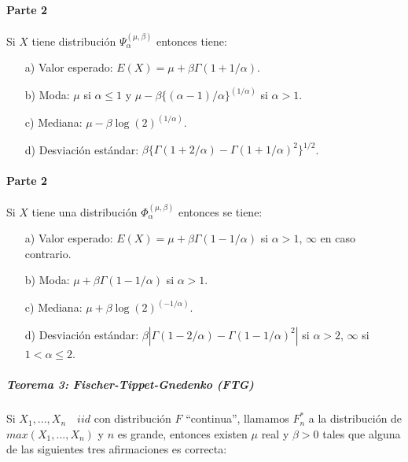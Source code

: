 \documentclass[
  12pt]{article}
\begin{document}
\hypertarget{parte-2}{%
\paragraph{Parte 2}\label{parte-2}}

Si \(X\) tiene distribución \(\Psi_{\alpha}^{(\mu,\beta)}\) entonces
tiene:

\begin{itemize}
  \item[a)] Valor esperado: $E(X) = \mu + \beta\Gamma(1+1/\alpha)$.
  \item[b)] Moda: $\mu$ si $\alpha\leq 1$ y $\mu-\beta\{(\alpha-1)/\alpha\}^{(1/\alpha)}$ si $\alpha>1$.
  \item[c)] Mediana: $\mu - \beta \log(2)^{(1/\alpha)}$.
  \item[d)] Desviación estándar: $\beta\{\Gamma(1+2/\alpha)-\Gamma(1+1/\alpha)^2\}^{1/2}$.
\end{itemize}

\hypertarget{parte-2-1}{%
\paragraph{Parte 2}\label{parte-2-1}}

Si \(X\) tiene una distribución \(\Phi_{\alpha}^{(\mu, \beta)}\)
entonces se tiene:

\begin{itemize}
  \item[a)] Valor esperado: $E(X) = \mu + \beta\Gamma(1-1/\alpha)$ si $\alpha > 1$, $\infty$ en caso contrario.
  \item[b)] Moda: $\mu + \beta\Gamma(1-1/\alpha)$ si $\alpha>1$.
  \item[c)] Mediana: $\mu + \beta \log(2)^{(-1/\alpha)}$.
  \item[d)] Desviación estándar: $\beta|\Gamma(1-2/\alpha)-\Gamma(1-1/\alpha)^2|$ si $\alpha>2$, $\infty$ si $1<\alpha \leq 2$.
\end{itemize}

\newpage

\hypertarget{teorema-3-fischer-tippet-gnedenko-ftg}{%
\subparagraph{Teorema 3: Fischer-Tippet-Gnedenko
(FTG)}\label{teorema-3-fischer-tippet-gnedenko-ftg}}

Si \(X_1,...,X_n\quad iid\) con distribución \(F\) ``continua'',
llamamos \(F_n^*\) a la distribución de \(max(X_1,...,X_n)\) y \(n\) es
grande, entonces existen \(\mu\) real y \(\beta>0\) tales que alguna de
las siguientes tres afirmaciones es correcta:
\end{document}
